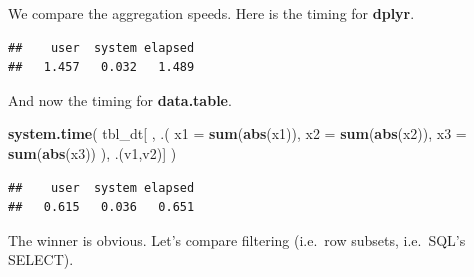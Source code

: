 \documentclass[]{book}
\newenvironment{Shaded}{\begin{snugshade}}{\end{snugshade}}
\newcommand{\KeywordTok}[1]{\textcolor[rgb]{0.13,0.29,0.53}{\textbf{#1}}}
\newcommand{\DataTypeTok}[1]{\textcolor[rgb]{0.13,0.29,0.53}{#1}}
\newcommand{\StringTok}[1]{\textcolor[rgb]{0.31,0.60,0.02}{#1}}
\newcommand{\OperatorTok}[1]{\textcolor[rgb]{0.81,0.36,0.00}{\textbf{#1}}}
\newcommand{\NormalTok}[1]{#1}
\theoremstyle{definition}
\theoremstyle{definition}
\theoremstyle{definition}
\theoremstyle{remark}
\begin{document}
We compare the aggregation speeds. Here is the timing for
\textbf{dplyr}.

\begin{Shaded}
\end{Shaded}

\begin{verbatim}
##    user  system elapsed 
##   1.457   0.032   1.489
\end{verbatim}

And now the timing for \textbf{data.table}.

\begin{Shaded}
\begin{Highlighting}[]
\KeywordTok{system.time}\NormalTok{( }
\NormalTok{  tbl_dt[ ,  .( }\DataTypeTok{x1 =} \KeywordTok{sum}\NormalTok{(}\KeywordTok{abs}\NormalTok{(x1)), }\DataTypeTok{x2 =} \KeywordTok{sum}\NormalTok{(}\KeywordTok{abs}\NormalTok{(x2)), }\DataTypeTok{x3 =} \KeywordTok{sum}\NormalTok{(}\KeywordTok{abs}\NormalTok{(x3)) ), .(v1,v2)]}
\NormalTok{  )}
\end{Highlighting}
\end{Shaded}

\begin{verbatim}
##    user  system elapsed 
##   0.615   0.036   0.651
\end{verbatim}

The winner is obvious. Let's compare filtering (i.e.~row subsets,
i.e.~SQL's SELECT).

\begin{Shaded}
\end{Shaded}
\end{document}
